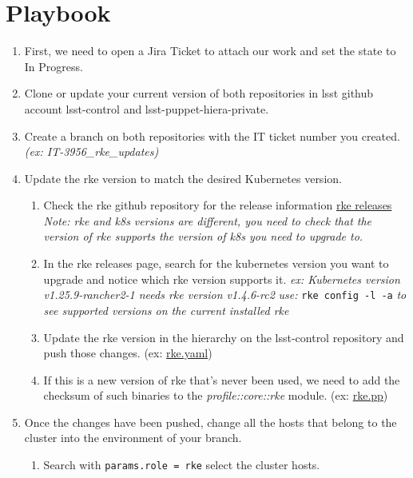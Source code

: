 \section{Playbook}

\begin{enumerate}
  \item First, we need to open a Jira Ticket to attach our work and set the state to In Progress.
  \item Clone or update your current version of both repositories in lsst github account lsst-control and lsst-puppet-hiera-private.
  \item Create a branch on both repositories with the IT ticket number you created. \textit{(ex: IT-3956\_rke\_updates)}
  \item Update the rke version to match the desired Kubernetes version.
  \begin{enumerate}[label=(\alph*)]
    \item Check the rke github repository for the release information \href{https://github.com/rancher/rke/releases}{rke releases}
      \textit{Note: rke and k8s versions are different, you need to check that the version of rke supports the version of k8s you need to upgrade to.}
    \item In the rke releases page, search for the kubernetes version you want to upgrade and notice which rke version supports it.
      \textit{ex: Kubernetes version v1.25.9-rancher2-1 needs rke version v1.4.6-rc2}
      \textit{use: } \verb|rke config -l -a| \textit{to see supported versions on the current installed rke}
    \item Update the rke version in the hierarchy on the lsst-control repository and push those changes. 
          (ex: \href{https://github.com/lsst-it/lsst-control/blob/6a2fa54f9e8eccb3dfe178e0234cd9546ddf0b3d/hieradata/site/cp/role/rke.yaml#L2}{rke.yaml})
    \item If this is a new version of rke that's never been used, we need to add the checksum of such binaries to the \textit{profile::core::rke} module.
          (ex: \href{https://github.com/lsst-it/lsst-control/blob/6a2fa54f9e8eccb3dfe178e0234cd9546ddf0b3d/site/profile/manifests/core/rke.pp#L43-L47}{rke.pp})
  \end{enumerate}
  \item Once the changes have been pushed, change all the hosts that belong to the cluster into the environment of your branch.
  \begin{enumerate}[label=(\alph*)]
    \item Search with \verb|params.role = rke| select the cluster hosts.

\end{enumerate}
\end{enumerate}

